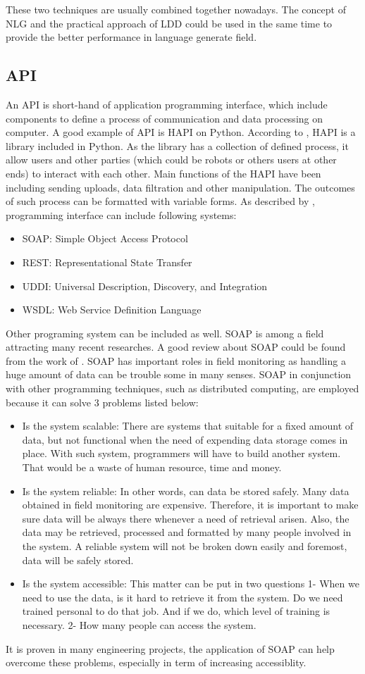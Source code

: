 These two techniques are usually combined together nowadays. 
The concept of NLG and the practical approach of LDD could be used in the same time to provide the better performance in language generate field.
\subsection{API}
An API is short-hand of  application programming interface, which include components to define a process of communication and data processing on computer. A good example of API is HAPI on Python. 
According to \cite{Kochanov201615}, HAPI is a library included in Python. 
As the library has a collection of defined process, it allow users and other parties (which could be robots or others users at other ends) to interact with each other.
Main functions of the HAPI have been including sending uploads, data filtration and other manipulation. 
The outcomes of such process can be formatted with variable forms. 
As described by \cite{Hedbrant20162206}, programming interface can include following systems:
\begin{itemize}
	\item SOAP: Simple Object Access Protocol
	\item REST: Representational State Transfer
	\item UDDI: Universal Description, Discovery, and Integration
	\item WSDL: Web Service Definition Language
\end{itemize}
	Other programing system can be included as well. 
	SOAP is among a field attracting many recent researches. 
	A good review about SOAP could be found from the work of \cite{Hsieh2009424}. 
	SOAP has important roles in field monitoring as handling a huge amount of data can be trouble some in many senses. 
	SOAP in conjunction with other programming techniques, such as distributed computing, are employed because it can solve 3 problems listed below:
	\begin{itemize}
		\item Is the system scalable: 
		There are systems that suitable for a fixed amount of data, but not functional when the need of expending data storage comes in place. 
		With such system, programmers will have to build another system. 
		That would be a waste of human resource, time and money.
		\item Is the system reliable: 
		In other words, can data be stored safely. 
		Many data obtained in field monitoring are expensive. 
		Therefore, it is important to make sure data will be always there whenever a need of retrieval arisen. 
		Also, the data may be retrieved, processed and formatted by many people involved in the system.
		A reliable system will not be broken down easily and foremost, data will be safely stored.
		\item Is the system accessible: 
		This matter can be put in two questions 1- When we need to use the data, is it hard to retrieve it from the system. 
		Do we need trained personal to do that job.
		And if we do, which level of training is necessary. 
		2- How many people can access the system. 
		
	\end{itemize}
	It is proven in many engineering projects, the application of SOAP can help overcome these problems, especially in term of increasing accessiblity.
\newpage %